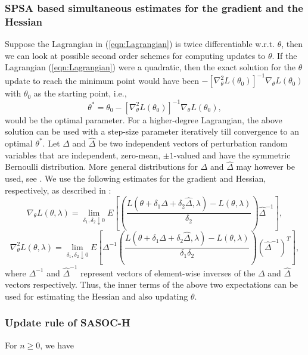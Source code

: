\documentclass[11pt,letterpaper,english]{article}
\begin{document}
\subsubsection{SPSA based simultaneous estimates for the gradient and the Hessian}
Suppose the Lagrangian in (\ref{eqn:Lagrangian}) is twice differentiable w.r.t. $\theta$, then we can look at possible second order schemes for computing updates to $\theta$. 
If the Lagrangian (\ref{eqn:Lagrangian}) were a quadratic, then the exact solution for the
$\theta$ update to reach the minimum point would have been $-[\nabla^2_\theta L (\theta_0)]^{-1} \nabla_\theta L(\theta_0)$ with $\theta_0$ as the starting point, i.e.,  \[\theta^* = \theta_0 -[\nabla^2_\theta L (\theta_0)]^{-1} \nabla_\theta L(\theta_0), \] would be the optimal parameter. 
For a higher-degree Lagrangian, the above solution can be used with a step-size parameter iteratively till convergence to an optimal $\theta^*$. Let $\Delta$ and $\widehat\Delta$ be two independent 
vectors of perturbation random variables that are independent, zero-mean, $\pm 1$-valued and have the symmetric Bernoulli distribution. More general distributions for $\Delta$ and $\widehat\Delta$ may however be used, see \citep{spall92multivariate,
spall2000adaptive}. We use the following estimates for the gradient and Hessian, respectively, as described in \citep[Section 3.2.1]{shalabh2011constrained}:
\[ \nabla_\theta L(\theta,\lambda) = \lim_{\delta_1,\delta_2\downarrow 0} E\left[ \left(
\frac{L(\theta +\delta_1\Delta+\delta_2\widehat{\Delta},\lambda) -
L(\theta,\lambda)}{\delta_2}\right) \widehat{\Delta}^{-1}\right], \]
\[ \nabla_\theta^2 L(\theta,\lambda) = \lim_{\delta_1,\delta_2\downarrow 0}
E\left[ \Delta^{-1}
\left( \frac{L(\theta +\delta_1\Delta+\delta_2\widehat{\Delta},\lambda) -
L(\theta,\lambda)}{\delta_1\delta_2}\right) \left(\widehat{\Delta}^{-1}\right)^T\right], \]
where $\Delta^{-1}$ and $\widehat\Delta^{-1}$ represent vectors of element-wise inverses 
of the $\Delta$ and $\widehat\Delta$ vectors respectively. Thus, the inner terms of the above two expectations can be used for estimating the Hessian and also updating $\theta$.

\subsubsection{Update rule of SASOC-H}
For $n \ge 0$, we have
\end{document}
